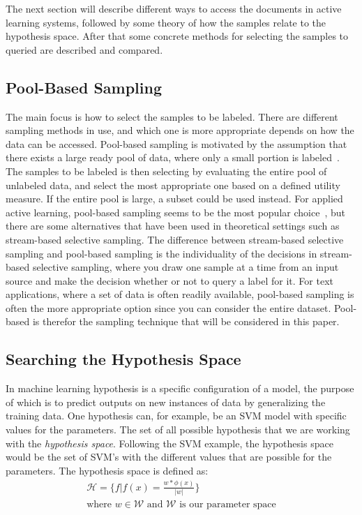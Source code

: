 The next section will describe different ways to access the documents in active learning systems, followed by some theory of how the samples relate to the hypothesis space.
After that some concrete methods for selecting the samples to queried are described and compared.

\subsection{Pool-Based Sampling}

The main focus is how to select the samples to be labeled.
There are different sampling methods in use, and which one is more appropriate depends on how the data can be accessed.
Pool-based sampling is motivated by the assumption that there exists a large ready pool of data, where only a small portion is labeled~\cite{lewis1994sequential, settles2012active}.
The samples to be labeled is then selecting by evaluating the entire pool of unlabeled data, and select the most appropriate one based on a defined utility measure.
If the entire pool is large, a subset could be used instead.
For applied active learning, pool-based sampling seems to be the most popular choice~\cite{li2013active}, but there are some alternatives that have been used in theoretical settings such as stream-based selective sampling.
The difference between stream-based selective sampling and pool-based sampling is the individuality of the decisions in stream-based selective sampling, where you draw one sample at a time from an input source and make the decision whether or not to query a label for it.
For text applications, where a set of data is often readily available, pool-based sampling is often the more appropriate option since you can consider the entire dataset.
Pool-based is therefor the sampling technique that will be considered in this paper.

\subsection{Searching the Hypothesis Space}

In machine learning hypothesis is a specific configuration of a model, the purpose of which is to predict outputs on new instances of data by generalizing the training data.
One hypothesis can, for example, be an SVM model with specific values for the parameters.
The set of all possible hypothesis that we are working with the \textit{hypothesis space}.
Following the SVM example, the hypothesis space would be the set of SVM's with the different values that are possible for the parameters.
The hypothesis space is defined as:
\begin{equation}
    \begin{aligned}
        \mathcal{H} = \Bigg \{ f | f(x) = \frac{w * \phi(x)}{|w|} \Bigg \}\\
        \text{where~$w \in \mathcal{W}$ and $\mathcal{W}$ is our parameter space}
    \end{aligned}
\end{equation}

